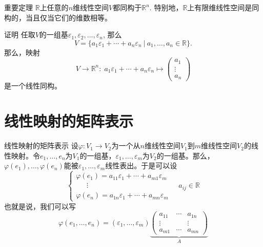
\begin{frame}

\begin{block}{重要定理}
$\mathbb{R}$上任意的$n$维线性空间$V$都同构于$\mathbb{R}^n$. 特别地，$\mathbb{R}$上有限维线性空间是同构的，当且仅当它们的维数相等。
\end{block}

\begin{block}{证明}
任取$V$的一组基$\varepsilon_1, \varepsilon_2, \ldots, \varepsilon_n$, 那么
$$V = \{ a_1\varepsilon_1 + \cdots + a_n\varepsilon_n \ |\ a_1,\ldots,a_n\in\mathbb{R} \}.$$
那么，映射
$$V \to \mathbb{R}^n: \; a_1\varepsilon_1 + \cdots + a_n\varepsilon_n \mapsto \begin{pmatrix} a_1 \\ \vdots \\ a_n \end{pmatrix}$$
是一个线性同构。
\end{block}

\end{frame}


\section{线性映射的矩阵表示}


\begin{frame}

\begin{block}{线性映射的矩阵表示}
设$\varphi: V_1 \to V_2$为一个从$n$维线性空间$V_1$到$m$维线性空间$V_2$的线性映射。令$e_1, \ldots, e_n$为$V_1$的一组基，$\varepsilon_1, \ldots, \varepsilon_m$为$V_2$的一组基。那么，$\varphi(e_1), \ldots, \varphi(e_n)$能被$\varepsilon_1, \ldots, \varepsilon_m$线性表出。于是可以设
\[
\begin{cases}
\varphi(e_1) = a_{11}\varepsilon_1 + \cdots + a_{m1}\varepsilon_m \\
\phantom{yyy} \vdots \\
\varphi(e_n) = a_{1n}\varepsilon_1 + \cdots + a_{mn}\varepsilon_m
\end{cases} \quad a_{ij}\in\mathbb{R}
\]
也就是说，我们可以写
$$\varphi(e_1, \ldots, e_n) = (\varepsilon_1, \ldots, \varepsilon_m) \underbrace{\begin{pmatrix}
a_{11} & \cdots & a_{1n} \\ \vdots & & \vdots \\ a_{m1} & \cdots & a_{mn} \end{pmatrix}}_{A}$$
\end{block}

\end{frame}

